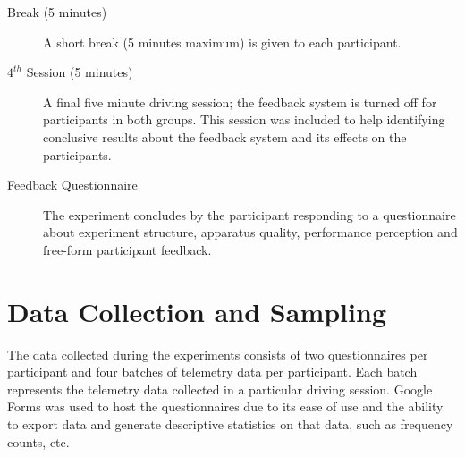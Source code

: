 \begin{description}
	\item[Break (5 minutes)] A short break (5 minutes maximum) is given to each participant.
	
	\item[$4^{th}$ Session (5 minutes)] A final five minute driving session; the feedback system is turned off for participants in both groups. This session was included to help identifying conclusive results about the feedback system and its effects on the participants. 
	
	
	\item[Feedback Questionnaire] The experiment concludes by the participant responding to a questionnaire about experiment structure, apparatus quality, performance perception and free-form participant feedback.
	
	
\end{description}

\section{Data Collection and Sampling}
\label{sec:meth-data-gathering}
The data collected during the experiments consists of two questionnaires per participant and four batches of telemetry data per participant. Each batch represents the telemetry data collected in a particular driving session. Google Forms was used to host the questionnaires due to its ease of use and the ability to export data and generate descriptive statistics on that data, such as frequency counts, etc.  


